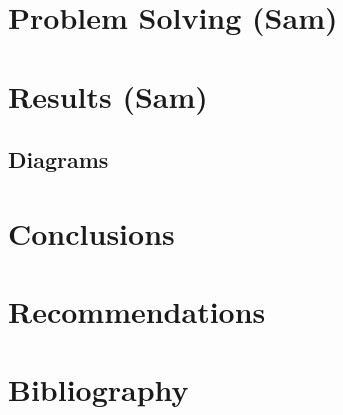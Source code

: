 \documentclass[letterpaper]{article}
\begin{document}
\section{Problem Solving (Sam)}
\label{sec:org34012b4}
\section{Results (Sam)}
\label{sec:orgdeec9c0}
\subsection{Diagrams}
\label{sec:org785155f}
\section{Conclusions}
\label{sec:orgb4f4c02}
\section{Recommendations}
\label{sec:org93ff01b}
\section{Bibliography}
\label{sec:org0fa76fd}
\end{document}
